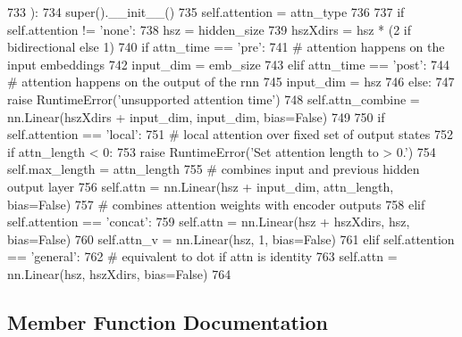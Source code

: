 \begin{DoxyCode}
733     ):
734         super().\_\_init\_\_()
735         self.attention = attn\_type
736 
737         \textcolor{keywordflow}{if} self.attention != \textcolor{stringliteral}{'none'}:
738             hsz = hidden\_size
739             hszXdirs = hsz * (2 \textcolor{keywordflow}{if} bidirectional \textcolor{keywordflow}{else} 1)
740             \textcolor{keywordflow}{if} attn\_time == \textcolor{stringliteral}{'pre'}:
741                 \textcolor{comment}{# attention happens on the input embeddings}
742                 input\_dim = emb\_size
743             \textcolor{keywordflow}{elif} attn\_time == \textcolor{stringliteral}{'post'}:
744                 \textcolor{comment}{# attention happens on the output of the rnn}
745                 input\_dim = hsz
746             \textcolor{keywordflow}{else}:
747                 \textcolor{keywordflow}{raise} RuntimeError(\textcolor{stringliteral}{'unsupported attention time'})
748             self.attn\_combine = nn.Linear(hszXdirs + input\_dim, input\_dim, bias=\textcolor{keyword}{False})
749 
750             \textcolor{keywordflow}{if} self.attention == \textcolor{stringliteral}{'local'}:
751                 \textcolor{comment}{# local attention over fixed set of output states}
752                 \textcolor{keywordflow}{if} attn\_length < 0:
753                     \textcolor{keywordflow}{raise} RuntimeError(\textcolor{stringliteral}{'Set attention length to > 0.'})
754                 self.max\_length = attn\_length
755                 \textcolor{comment}{# combines input and previous hidden output layer}
756                 self.attn = nn.Linear(hsz + input\_dim, attn\_length, bias=\textcolor{keyword}{False})
757                 \textcolor{comment}{# combines attention weights with encoder outputs}
758             \textcolor{keywordflow}{elif} self.attention == \textcolor{stringliteral}{'concat'}:
759                 self.attn = nn.Linear(hsz + hszXdirs, hsz, bias=\textcolor{keyword}{False})
760                 self.attn\_v = nn.Linear(hsz, 1, bias=\textcolor{keyword}{False})
761             \textcolor{keywordflow}{elif} self.attention == \textcolor{stringliteral}{'general'}:
762                 \textcolor{comment}{# equivalent to dot if attn is identity}
763                 self.attn = nn.Linear(hsz, hszXdirs, bias=\textcolor{keyword}{False})
764 
\end{DoxyCode}


\subsection{Member Function Documentation}
\mbox{\label{classparlai_1_1agents_1_1legacy__agents_1_1seq2seq_1_1modules__v0_1_1AttentionLayer_a6b5727eb84f3cab62adc1c647e23b98a}} 
